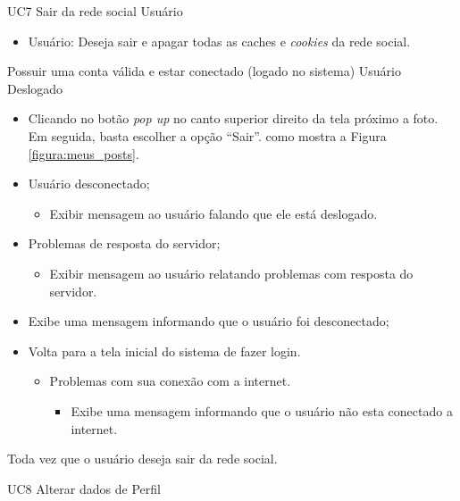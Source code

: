 \casoDeUso
{UC7}
{Sair da rede social}
{Usuário}
{
\begin{itemize}
	\item Usuário: Deseja sair e apagar todas as caches e \textit{cookies} da rede social.
\end{itemize}
}
{Possuir uma conta válida e estar conectado (logado no sistema)}
{Usuário Deslogado}
{
\begin{itemize}
	\item Clicando no botão  \textit{pop up} no canto superior direito da tela próximo a foto. Em seguida, basta escolher a opção “Sair”.  como mostra a Figura  \ref{figura:meus_posts}.
\end{itemize}
}
{
\begin{itemize}
	\item Usuário desconectado;
		\begin{itemize}
		\item Exibir mensagem  ao usuário falando que ele está deslogado.
		\end{itemize}
	\item Problemas de resposta do servidor;
		\begin{itemize}
		\item Exibir mensagem  ao usuário relatando problemas com resposta do servidor.
		\end{itemize}
	\item Exibe uma mensagem informando que o usuário foi desconectado;
	\item Volta para a tela inicial do sistema de fazer login.
		\begin{itemize}
		\item Problemas com sua conexão com a internet.
			\begin{itemize}
			\item Exibe uma mensagem informando que o usuário não esta conectado a internet.
			\end{itemize}
		\end{itemize}
	
\end{itemize}
}
{Toda vez que o usuário deseja sair da rede social.}
{

}
\casoDeUso
{UC8}
{Alterar dados de Perfil}
